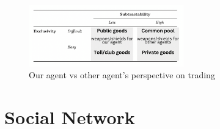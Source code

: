 \begin{figure}[!ht]
    \centering
    \includegraphics[width=0.60\textwidth]{008_team_5_agent_design/images/13.png}
    \caption{Our agent vs other agent's perspective on trading \cite{pitt}}
    \label{13}
\end{figure}

\section{Social Network}

